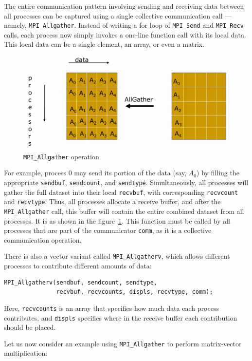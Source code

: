 \documentclass[12pt]{book}
\begin{document}
The entire communication pattern involving sending and receiving data between all processes can be captured using a single collective communication call — namely, \texttt{MPI\_Allgather}. Instead of writing a for loop of \texttt{MPI\_Send} and \texttt{MPI\_Recv} calls, each process now simply invokes a one-line function call with its local data. This local data can be a single element, an array, or even a matrix.
\begin{figure}[ht]
    \centering
    \includegraphics[width=0.75\linewidth]{images/all_gather.png}
    \caption{\texttt{MPI\_Allgather} operation}
    \label{fig:allgather}
\end{figure}
For example, process 0 may send its portion of the data (say, $A_0$) by filling the appropriate \texttt{sendbuf}, \texttt{sendcount}, and \texttt{sendtype}. Simultaneously, all processes will gather the full dataset into their local \texttt{recvbuf}, with corresponding \texttt{recvcount} and \texttt{recvtype}. Thus, all processes allocate a receive buffer, and after the \texttt{MPI\_Allgather} call, this buffer will contain the entire combined dataset from all processes. It is as shown in the figure~\ref{fig:allgather}. This function must be called by all processes that are part of the communicator \texttt{comm}, as it is a collective communication operation.

There is also a vector variant called \texttt{MPI\_Allgatherv}, which allows different processes to contribute different amounts of data:

\begin{lstlisting}[style=cppstyle]
MPI_Allgatherv(sendbuf, sendcount, sendtype, 
               recvbuf, recvcounts, displs, recvtype, comm);
\end{lstlisting}

Here, \texttt{recvcounts} is an array that specifies how much data each process contributes, and \texttt{displs} specifies where in the receive buffer each contribution should be placed.

Let us now consider an example using \texttt{MPI\_Allgather} to perform matrix-vector multiplication:
\end{document}
